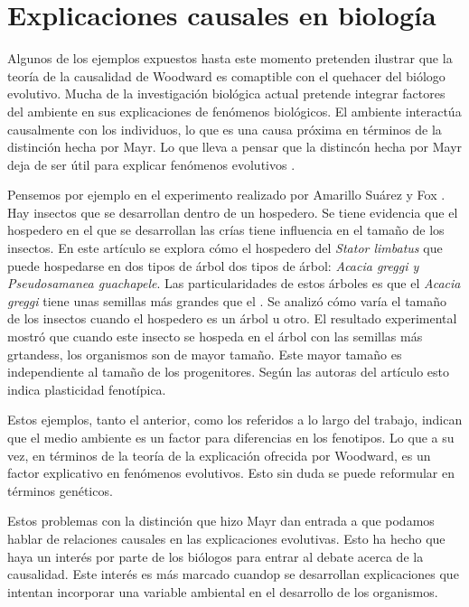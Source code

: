 \section{Explicaciones causales en biología}

Algunos de los ejemplos expuestos hasta este momento pretenden ilustrar que la teoría de la causalidad de Woodward es comaptible con el quehacer del biólogo evolutivo. Mucha de la investigación biológica actual pretende integrar factores del ambiente en sus explicaciones de fenómenos biológicos. El ambiente interactúa causalmente con los individuos, lo que es una causa próxima en términos de la distinción hecha por Mayr. Lo que lleva a pensar que la distincón hecha por Mayr deja de ser útil para explicar fenómenos evolutivos \cite{Uller2020, Dayan2020, Laland2011}.

Pensemos por ejemplo en el experimento realizado por Amarillo Suárez y Fox \citeyear{Amarillo-Suarez2006}. Hay insectos que se desarrollan dentro de un hospedero. Se tiene evidencia que el hospedero en el que se desarrollan las crías tiene influencia en el tamaño de los insectos. En este artículo se explora cómo el hospedero del \emph{Stator limbatus} que puede hospedarse en dos tipos de árbol  dos tipos de árbol: \emph{Acacia greggi y Pseudosamanea guachapele}. Las particularidades de estos árboles es que el \emph{Acacia greggi} tiene unas semillas más grandes que el . Se analizó cómo varía el tamaño de los insectos cuando el hospedero es un árbol u otro. El resultado experimental mostró que cuando este insecto se hospeda en el árbol con las semillas más grtandess, los organismos son de mayor tamaño. Este mayor tamaño es independiente al tamaño de los progenitores. Según las autoras del artículo esto indica plasticidad fenotípica.

Estos ejemplos, tanto el anterior, como los referidos a lo largo del trabajo, indican que el medio ambiente es un factor para diferencias en los fenotipos. Lo que a su vez, en términos de la teoría de la explicación ofrecida por Woodward, es un factor explicativo en fenómenos evolutivos. Esto sin duda se puede reformular en términos genéticos.

Estos problemas con la distinción que hizo Mayr dan entrada a que podamos hablar de relaciones causales en las explicaciones evolutivas. Esto ha hecho que haya un interés por parte de los biólogos para entrar al debate acerca de la causalidad. Este interés es más marcado cuandop se desarrollan explicaciones que intentan incorporar una variable ambiental en el desarrollo de los organismos.




